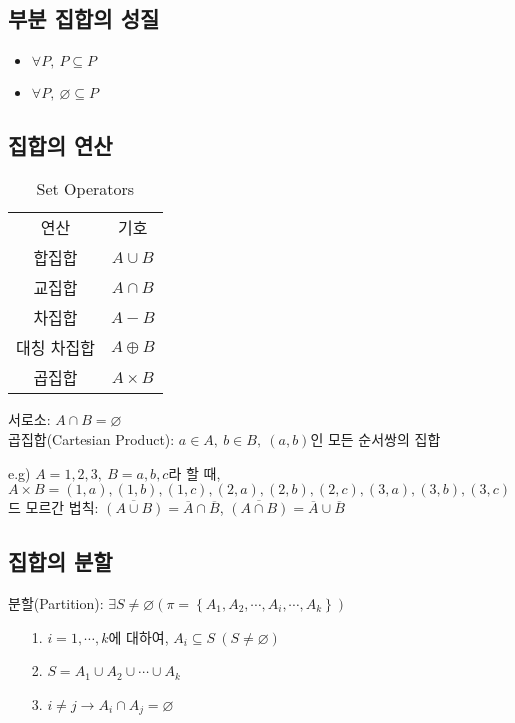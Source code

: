 \subsection{부분 집합의 성질}
\begin{itemize}
    \item $\forall P,\ P \subseteq P$
    \item $\forall P,\ \varnothing \subseteq P$
\end{itemize}
\subsection{집합의 연산}
\begin{table}[]
    \caption {Set Operators}
    \centering
    \begin{tabular}[1.5]{c|c}
    연산      & 기호\\
    \Xhline{3\arrayrulewidth}
    합집합  & $A \cup B$\\
    \hline
    교집합 & $A \cap B$\\
    \hline
    차집합 &$A-B$\\
    \hline
    대칭 차집합&$A\oplus B$\\
    \hline
    곱집합&$A\times B$
    \end{tabular}
\end{table}$$$$
서로소: $A \cap B = \varnothing$\\
곱집합(Cartesian Product): $a\in A,\ b \in B,\ (a, b)$인 모든 순서쌍의 집합

e.g) $A={1, 2, 3},\ B={a, b, c}$라 할 때, $A\times B = {(1, a), (1, b), (1, c), (2, a), (2, b), (2, c), (3, a), (3, b), (3, c)}$\\
드 모르간 법칙: $\overline{(A\cup B)} = \overline{A} \cap \overline{B}$, $\overline{(A \cap B)} = \overline{A} \cup \overline{B}$

\subsection{집합의 분할}
분할(Partition): $\exists S \neq \varnothing (\pi = \left\{A_1, A_2, \cdots, A_i, \cdots, A_k\right\})$
\begin{itemize}
    \item[1.] $i=1, \cdots, k$에 대하여, $A_i \subseteq S\ (S \neq \varnothing)$
    \item[2.] $S=A_1\cup A_2\cup \cdots \cup A_k$
    \item[3.] $i\neq j \to A_i \cap A_j = \varnothing$
\end{itemize}

